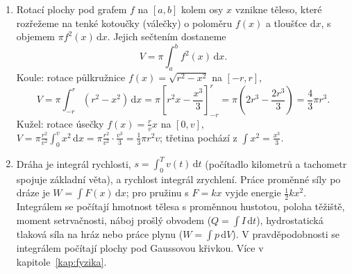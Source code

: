 \begin{enumerate}[label=\textbf{\arabic*.}, leftmargin=*, itemsep=0.8em]
  \item {}
  Rotací plochy pod grafem $f$ na $[a, b]$ kolem osy $x$ vznikne těleso, které rozřežeme na tenké kotoučky (válečky) o poloměru $f(x)$ a tloušťce $\mathrm{d}x$, s objemem $\pi f^2(x)\,\mathrm{d}x$. Jejich sečtením dostaneme
  \begin{equation*}
    V = \pi\int_a^b f^2(x)\,\mathrm{d}x.
  \end{equation*}
  Koule: rotace půlkružnice $f(x) = \sqrt{r^2 - x^2}$ na $[-r, r]$,
  \begin{equation*}
    V = \pi\int_{-r}^{r}(r^2 - x^2)\,\mathrm{d}x = \pi\left[r^2x - \frac{x^3}{3}\right]_{-r}^{r} = \pi\left(2r^3 - \frac{2r^3}{3}\right) = \frac{4}{3}\pi r^3.
  \end{equation*}
  Kužel: rotace úsečky $f(x) = \frac{r}{v}x$ na $[0, v]$, $V = \pi\frac{r^2}{v^2}\int_0^v x^2\,\mathrm{d}x = \pi\frac{r^2}{v^2}\cdot\frac{v^3}{3} = \frac{1}{3}\pi r^2v$; třetina pochází z $\int x^2 = \frac{x^3}{3}$. 

  \item {}
  Dráha je integrál rychlosti, $s = \int_0^T v(t)\,\mathrm{d}t$ (počítadlo kilometrů a tachometr spojuje základní věta), a rychlost integrál zrychlení. Práce proměnné síly po dráze je $W = \int F(x)\,\mathrm{d}x$; pro pružinu s $F = kx$ vyjde energie $\frac{1}{2}kx^2$. Integrálem se počítají hmotnost tělesa s proměnnou hustotou, poloha těžiště, moment setrvačnosti, náboj prošlý obvodem ($Q = \int I\,\mathrm{d}t$), hydrostatická tlaková síla na hráz nebo práce plynu ($W = \int p\,\mathrm{d}V$). V pravděpodobnosti se integrálem počítají plochy pod Gaussovou křivkou. Více v kapitole~\ref{kap:fyzika}. 
\end{enumerate}
